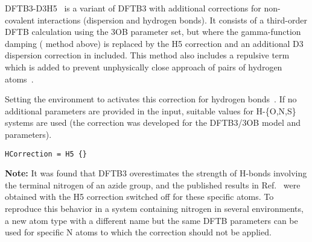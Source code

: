 DFTB3-D3H5~\cite{rezac-jctc-13-2017} is a variant of DFTB3 with additional
corrections for non-covalent interactions (dispersion and hydrogen bonds).  It
consists of a third-order DFTB calculation using the 3OB parameter set, but
where the gamma-function damping ( method above) is replaced by the
H5 correction and an additional D3 dispersion correction in included. This
method also includes a repulsive term which is added to prevent unphysically
close approach of pairs of hydrogen atoms~\cite{rezac-jctc-8-2012}.

Setting the  environment to  activates this
correction for hydrogen bonds~\cite{rezac-jctc-13-2017}. If no additional
parameters are provided in the input, suitable values for H-\{O,N,S\} systems
are used (the correction was developed for the DFTB3/3OB model and parameters).
\begin{verbatim}
HCorrection = H5 {}
\end{verbatim}

\textbf{Note:} It was found that DFTB3 overestimates the strength of H-bonds
involving the terminal nitrogen of an azide group, and the published results in
Ref.~\cite{rezac-jctc-13-2017} were obtained with the H5 correction switched off
for these specific atoms. To reproduce this behavior in a system containing
nitrogen in several environments, a new atom type with a different name but the
same DFTB parameters can be used for specific N atoms to which the correction
should not be applied.

